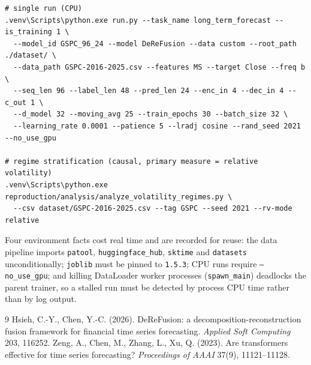 \documentclass[preprint,12pt]{elsarticle}
\begin{document}
\begin{verbatim}
# single run (CPU)
.venv\Scripts\python.exe run.py --task_name long_term_forecast --is_training 1 \
  --model_id GSPC_96_24 --model DeReFusion --data custom --root_path ./dataset/ \
  --data_path GSPC-2016-2025.csv --features MS --target Close --freq b \
  --seq_len 96 --label_len 48 --pred_len 24 --enc_in 4 --dec_in 4 --c_out 1 \
  --d_model 32 --moving_avg 25 --train_epochs 30 --batch_size 32 \
  --learning_rate 0.0001 --patience 5 --lradj cosine --rand_seed 2021 --no_use_gpu

# regime stratification (causal, primary measure = relative volatility)
.venv\Scripts\python.exe reproduction/analysis/analyze_volatility_regimes.py \
  --csv dataset/GSPC-2016-2025.csv --tag GSPC --seed 2021 --rv-mode relative
\end{verbatim}

Four environment facts cost real time and are recorded for reuse: the data pipeline imports
\texttt{patool}, \texttt{huggingface\_hub}, \texttt{sktime} and \texttt{datasets} unconditionally;
\texttt{joblib} must be pinned to \texttt{1.5.3}; CPU runs require \texttt{--no\_use\_gpu}; and
killing DataLoader worker processes (\texttt{spawn\_main}) deadlocks the parent trainer, so a
stalled run must be detected by process CPU time rather than by log output.

\begin{thebibliography}{9}
\bibitem{hsieh2026} Hsieh, C.-Y., Chen, Y.-C. (2026). DeReFusion: a decomposition-reconstruction
fusion framework for financial time series forecasting. \emph{Applied Soft Computing} 203, 116252.
\bibitem{zeng2023} Zeng, A., Chen, M., Zhang, L., Xu, Q. (2023). Are transformers effective for
time series forecasting? \emph{Proceedings of AAAI} 37(9), 11121--11128.
\end{thebibliography}
\end{document}
